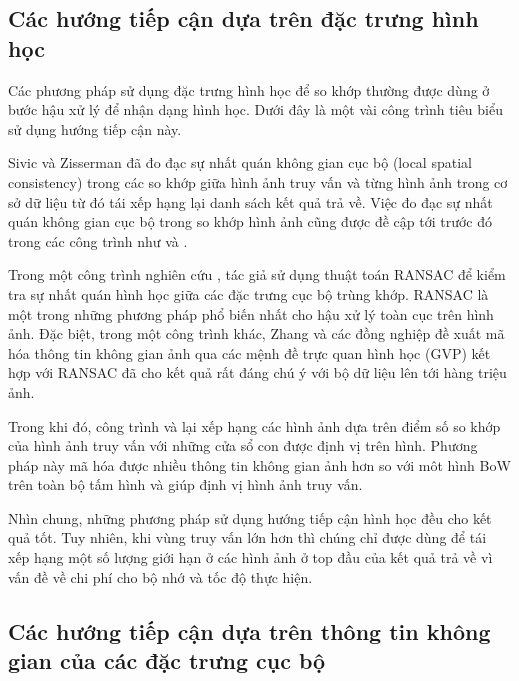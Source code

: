 \subsection{Các hướng tiếp cận dựa trên đặc trưng hình học}
\label{geometry}
Các phương pháp sử dụng đặc trưng hình học để so khớp thường được dùng ở bước hậu xử lý để nhận dạng hình học. Dưới đây là một vài công trình tiêu biểu sử dụng hướng tiếp cận này.

Sivic và Zisserman \cite{sivic2003video} đã đo đạc sự nhất quán không gian cục bộ (local spatial consistency) trong các so khớp giữa hình ảnh truy vấn và từng hình ảnh trong cơ sở dữ liệu từ đó tái xếp hạng lại danh sách kết quả trả về. Việc đo đạc sự nhất quán không gian cục bộ trong so khớp hình ảnh cũng được đề cập tới trước đó trong các công trình như \cite{zhang1995robust} và \cite{schmid1997local}.

Trong một công trình nghiên cứu \cite{philbin2007object}, tác giả sử dụng thuật toán RANSAC \cite{fischler1981random} để kiểm tra sự nhất quán hình học giữa các đặc trưng cục bộ trùng khớp. RANSAC là một trong những phương pháp phổ biến nhất cho hậu xử lý toàn cục trên hình ảnh. Đặc biệt, trong một công trình khác, Zhang và các đồng nghiệp \cite{zhang2011image} đề xuất mã hóa thông tin không gian ảnh qua các mệnh đề trực quan hình học (GVP) kết hợp với RANSAC đã cho kết quả rất đáng chú ý với bộ dữ liệu lên tới hàng triệu ảnh.

Trong khi đó, công trình \cite{lin2010local} và \cite{lampert2009detecting} lại xếp hạng các hình ảnh dựa trên điểm số so khớp của hình ảnh truy vấn với những cửa sổ con được định vị trên hình. Phương pháp này mã hóa được nhiều thông tin không gian ảnh hơn so với môt hình BoW trên toàn bộ tấm hình và giúp định vị hình ảnh truy vấn.

Nhìn chung, những phương pháp sử dụng hướng tiếp cận hình học đều cho kết quả tốt. Tuy nhiên, khi vùng truy vấn lớn hơn thì chúng chỉ được dùng để tái xếp hạng một số lượng giới hạn ở các hình ảnh ở top đầu của kết quả trả về vì vấn đề về chi phí cho bộ nhớ và tốc độ thực hiện.

\subsection{Các hướng tiếp cận dựa trên thông tin không gian của các đặc trưng cục bộ}
\label{spm}

